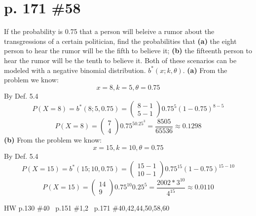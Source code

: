 \documentclass[12pt]{article}
\begin{document}
	\section[20pt]{p. 171 \#58}
	If the probability is 0.75 that a person will beleive a rumor about the transgressions of a certain politician, find the probabilities that \newline
	\textbf{(a)} the eight person to hear the rumor will be the fifth to believe it; \newline
	\textbf{(b)} the fifteenth person to hear the rumor will be the tenth to believe it.
	\newline
	\newline
	Both of these scenarios can be modeled with a negative binomial distribution. \(b^*(x;k,\theta)\). \newline
	\textbf{(a)} From the problem we know:
	\[x=8,k=5,\theta=0.75\]
	By Def. 5.4
	\[P(X=8)=b^*(8;5,0.75)=\left(
	\begin{array}{ccc}
	8-1\\ 5-1
	\end{array}\right)0.75^5(1-0.75)^{8-5}\]
	\[P(X=8)=\left(\begin{array}{ccc}
	7\\ 4
	\end{array}\right)0.75^50.25^{3}=\frac{8505}{65536} \approx 0.1298\]
	\newline
	\newline
	\textbf{(b)} From the problem we know:
	\[x=15,k=10,\theta=0.75\]
	By Def. 5.4
	\[P(X=15)=b^*(15;10,0.75)=\left(
	\begin{array}{ccc}
	15-1\\ 10-1
	\end{array}\right)0.75^{15}(1-0.75)^{15-10}\]
	\[P(X=15)=\left(\begin{array}{ccc}
	14 \\ 9
	\end{array}\right)0.75^{10}0.25^{5}=\frac{2002*3^{10}}{4^{15}} \approx 0.0110\]
	\newpage
	\maketitle HW p.130 \#40 \ p.151 \#1,2 \ p.171 \#40,42,44,50,58,60
\end{document}
